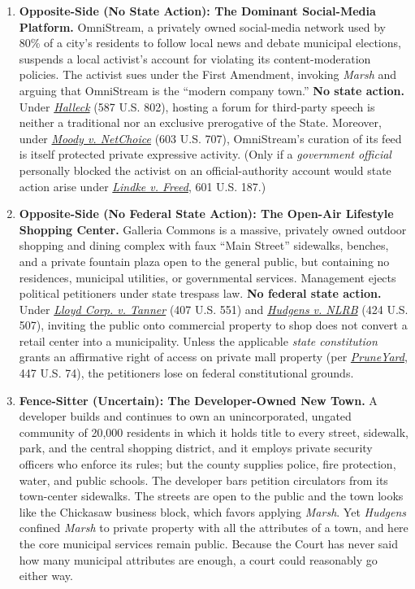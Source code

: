 \documentclass[12pt]{article}
\begin{document}
\begin{enumerate}
\item \textbf{Opposite-Side (No State Action): The Dominant Social-Media Platform.} OmniStream, a privately owned social-media network used by 80\% of a city's residents to follow local news and debate municipal elections, suspends a local activist's account for violating its content-moderation policies. The activist sues under the First Amendment, invoking \textit{Marsh} and arguing that OmniStream is the ``modern company town.'' \textbf{No state action.} Under \href{https://supreme.justia.com/cases/federal/us/587/17-1702/}{\textit{Halleck}} (587 U.S. 802), hosting a forum for third-party speech is neither a traditional nor an exclusive prerogative of the State. Moreover, under \href{https://supreme.justia.com/cases/federal/us/603/22-277/}{\textit{Moody v. NetChoice}} (603 U.S. 707), OmniStream's curation of its feed is itself protected private expressive activity. (Only if a \textit{government official} personally blocked the activist on an official-authority account would state action arise under \href{https://supreme.justia.com/cases/federal/us/601/22-611/}{\textit{Lindke v. Freed}}, 601 U.S. 187.)

\item \textbf{Opposite-Side (No Federal State Action): The Open-Air Lifestyle Shopping Center.} Galleria Commons is a massive, privately owned outdoor shopping and dining complex with faux ``Main Street'' sidewalks, benches, and a private fountain plaza open to the general public, but containing no residences, municipal utilities, or governmental services. Management ejects political petitioners under state trespass law. \textbf{No federal state action.} Under \href{https://supreme.justia.com/cases/federal/us/407/551/}{\textit{Lloyd Corp. v. Tanner}} (407 U.S. 551) and \href{https://supreme.justia.com/cases/federal/us/424/507/}{\textit{Hudgens v. NLRB}} (424 U.S. 507), inviting the public onto commercial property to shop does not convert a retail center into a municipality. Unless the applicable \textit{state constitution} grants an affirmative right of access on private mall property (per \href{https://supreme.justia.com/cases/federal/us/447/74/}{\textit{PruneYard}}, 447 U.S. 74), the petitioners lose on federal constitutional grounds.

\item \textbf{Fence-Sitter (Uncertain): The Developer-Owned New Town.} A developer builds and continues to own an unincorporated, ungated community of 20,000 residents in which it holds title to every street, sidewalk, park, and the central shopping district, and it employs private security officers who enforce its rules; but the county supplies police, fire protection, water, and public schools. The developer bars petition circulators from its town-center sidewalks. The streets are open to the public and the town looks like the Chickasaw business block, which favors applying \textit{Marsh}. Yet \textit{Hudgens} confined \textit{Marsh} to private property with all the attributes of a town, and here the core municipal services remain public. Because the Court has never said how many municipal attributes are enough, a court could reasonably go either way.

\end{enumerate}
\end{document}
